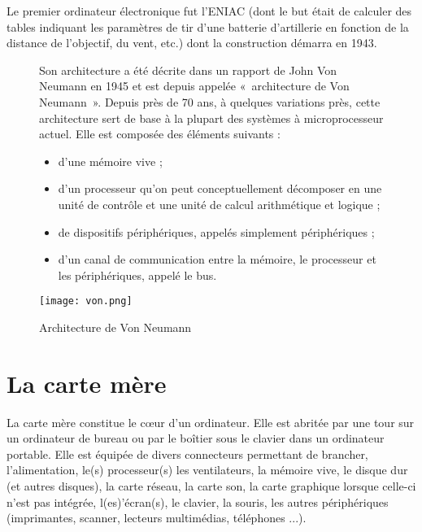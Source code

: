 Le premier ordinateur électronique fut l’ENIAC
(dont le but était de calculer des tables indiquant les paramètres de tir d’une batterie d’artillerie
en fonction de la distance de l’objectif, du vent, etc.) dont la construction démarra
en 1943. 

\begin{figure}[h]
\begin{minipage}[c]{.49\linewidth}

Son architecture a été décrite dans un rapport de John Von Neumann en 1945 et
est depuis appelée «~architecture de Von Neumann~». Depuis près de 70 ans, à quelques variations
près, cette  architecture sert de base à la plupart des systèmes à microprocesseur actuel. Elle est composée des éléments suivants :
\begin{itemize}
\item d'une mémoire vive ;
\item d'un processeur qu'on peut conceptuellement décomposer en une unité de contrôle et
une unité de calcul arithmétique et logique ;
\item de dispositifs périphériques, appelés simplement périphériques ;
\item d'un canal de communication entre la mémoire, le processeur et les périphériques, appelé
le bus.
\end{itemize}

\end{minipage} \hfill
\begin{minipage}[c]{.49\linewidth}
\begin{center}
\texttt{[image: von.png]}
\caption{Architecture de Von Neumann}
\label{}
\end{center}
\end{minipage}
\end{figure}




\section{La carte mère}
La carte mère constitue le c\oe{}ur d'un ordinateur. Elle est abritée par une tour sur un ordinateur de bureau ou par le boîtier sous le clavier dans un ordinateur portable. Elle est équipée de divers connecteurs permettant de brancher, l'alimentation, le(s) processeur(s)
les ventilateurs, 
la mémoire vive, 
le disque dur (et autres disques), 
la carte réseau, 
la carte son, 
la carte graphique lorsque celle-ci n'est pas intégrée, 
l(es)'écran(s), 
le clavier,  
la souris, 
les autres périphériques (imprimantes, scanner, lecteurs multimédias, téléphones ...).



